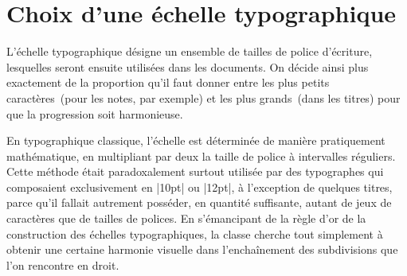 
\section{Choix d'une échelle typographique}

L'échelle typographique désigne un ensemble de tailles de police d'écriture, lesquelles seront ensuite utilisées dans les documents. On décide ainsi plus exactement de la proportion qu'il faut donner entre les plus petits caractères~(pour les notes, par exemple) et les plus grands~(dans les titres) pour que la progression soit harmonieuse.

En typographique classique, l'échelle est déterminée de manière pratiquement mathématique, en multipliant par deux la taille de police à intervalles réguliers. Cette méthode était paradoxalement surtout utilisée par des typographes qui composaient exclusivement en |10pt| ou |12pt|, à l'exception de quelques titres, parce qu'il fallait autrement posséder, en quantité suffisante, autant de jeux de caractères que de tailles de polices. En s'émancipant de la règle d'or de la construction des échelles typographiques, la classe \frenchlaw cherche tout simplement à obtenir une certaine harmonie visuelle dans l'enchaînement des subdivisions que l'on rencontre en droit.

\begin{noprint}
\newdimen\addto@miniscule
\newdimen\addto@tiny
\newdimen\addto@large
\newdimen\addto@Large
\newdimen\addto@LARGE
\newdimen\addto@huge
\newdimen\addto@Huge
\newdimen\addto@HUGE
\end{noprint}


